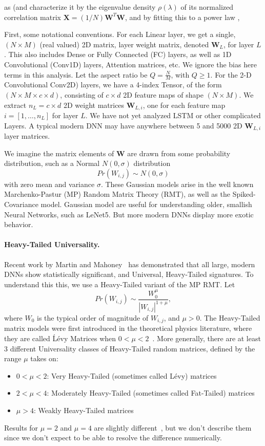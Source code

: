 as (and characterize it by the eigenvalue density $\rho(\lambda)$ of its normalized
correlation matrix $\mathbf{X}=(1/N)\mathbf{W}^{T}\mathbf{W}$, and by fitting this to a power law ,




First, some notational conventions.
For each Linear layer, we get a  single, $(N\times M)$ (real valued) 2D matrix, layer weight matrix, denoted $\mathbf{W}_{L}$, for layer $L$.  
This also includes Dense or Fully Connected (FC) layers, as well as 1D Convolutional (Conv1D) layers, Attention matrices, etc.
We ignore the bias here terms in this analysis.  Let the aspect ratio be $Q=\frac{N}{M}$, with $Q\ge 1$.
For the 2-D Convolutional Conv2D) layers, we have a 4-index Tensor, of the form $(N\times M \times c\times d)$, consisting
of $c\times d$ 2D feature maps of shape $(N\times M)$.    
We  extract $n_{L}=c\times d$  2D  weight matrices $\mathbf{W}_{L,i}$, one for each feature map $i=[1,\dots,n_{L}]$ for layer $L$.
We have not yet analyzed LSTM or other complicated Layers. 
A typical modern DNN may have anywhere between 5 and 5000 2D $\mathbf{W}_{L,i}$ layer matrices.
   
We imagine the matrix elements of $\mathbf{W}$  are drawn from some probability distribution, such as a Normal $N(0,\sigma)$ distribution
$$
Pr(W_{i,j})\sim N(0,\sigma)
$$
with zero mean and variance $\sigma$. 
These Gaussian models arise in the well known Marchenko-Pastur (MP) Random Matrix Theory (RMT), as well as the Spiked-Covariance model. 
Gaussian model are useful for understanding older, smallish Neural Networks, such as LeNet5.
But more modern DNNs display more exotic behavior.  


\paragraph{Heavy-Tailed Universality.} 
Recent work by Martin and Mahoney~\cite{MM18_TR} has demonstrated that all large, modern DNNs show statistically significant, and Universal, Heavy-Tailed signatures.  
To understand this this, we use a Heavy-Tailed variant of the MP RMT.  
Let 
$$
Pr(W_{i,j})\sim\dfrac{W_{0}^{\mu}}{|W_{i,j}|^{1+\mu}}  ,
$$
where $W_{0}$ is the typical order of magnitude of $W_{i,j}$, and $\mu>0$. 
The Heavy-Tailed matrix models were first introduced in the theoretical physics literature, where they are called \'L\'evy Matrices when $0<\mu<2$~\cite{PB94}.
More generally, there are at least 3 different Universality classes of Heavy-Tailed random matrices, defined by the range $\mu$ takes on:
\begin{itemize}
\item $0<\mu<2$: Very Heavy-Tailed (sometimes called L\'evy) matrices
\item $2<\mu<4$: Moderately Heavy-Tailed (sometimes called Fat-Tailed) matrices
\item $\mu>4$: Weakly Heavy-Tailed matrices
\end{itemize}
Results for $\mu=2$ and $\mu=4$ are slightly different~\cite{SornetteBook,BouchaudPotters03}, but we don't describe them since we don't expect to be able to resolve the difference numerically.

